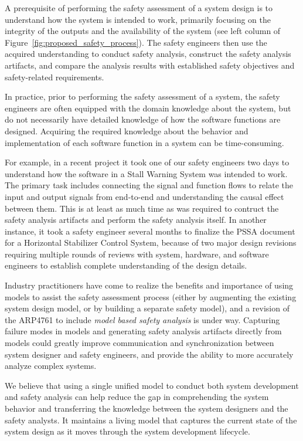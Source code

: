 A prerequisite of performing the safety assessment of a system design is to understand how the system is intended to work, primarily focusing on the integrity of the outputs and the availability of the system (see left column of Figure~\ref{fig:proposed_safety_process}). The safety engineers then use the acquired understanding to conduct safety analysis, construct the safety analysis artifacts, and compare the analysis results with established safety objectives and safety-related requirements. 

In practice, prior to performing the safety assessment of a system, the safety engineers are often equipped with the domain knowledge about the system, but do not necessarily have detailed knowledge of how the software functions are designed. Acquiring the required knowledge about the behavior and implementation of each software function in a system can be time-consuming.

For example, in a recent project it took one of our safety engineers two days to understand how the software in a Stall Warning System was intended to work. The primary task includes connecting the signal and function flows to relate the input and output signals from end-to-end and understanding the causal effect between them. This is at least as much time as was required to contruct the safety analysis artifacts and perform the safety analysis itself. In another instance, it took a safety engineer several months to finalize the PSSA document for a Horizontal Stabilizer Control System, because of two major design revisions requiring multiple rounds of reviews with system, hardware, and software engineers to establish complete understanding of the design
details.

Industry practitioners have come to realize the benefits and importance of
using models to assist the safety assessment process (either by augmenting the existing system design model, or by building a separate safety model), and a revision of the ARP4761 to include {\em model based safety analysis} is under way.
Capturing failure modes in models and generating safety analysis artifacts directly from models could greatly improve communication and synchronization between system designer and safety engineers, and provide the ability to more accurately analyze complex systems. 

We believe that using a single unified model to conduct both system development and safety analysis can help reduce the gap in comprehending the system behavior and transferring the knowledge between the system designers and the safety analysts. It maintains a living model that captures the current state of the system design as it moves through the system development lifecycle.

